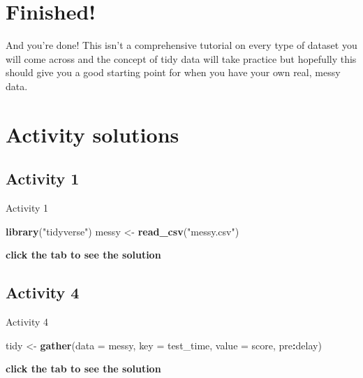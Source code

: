 \documentclass[]{book}
\newenvironment{Shaded}{\begin{snugshade}}{\end{snugshade}}
\newcommand{\DataTypeTok}[1]{\textcolor[rgb]{0.13,0.29,0.53}{#1}}
\newcommand{\KeywordTok}[1]{\textcolor[rgb]{0.13,0.29,0.53}{\textbf{#1}}}
\newcommand{\NormalTok}[1]{#1}
\newcommand{\OperatorTok}[1]{\textcolor[rgb]{0.81,0.36,0.00}{\textbf{#1}}}
\newcommand{\StringTok}[1]{\textcolor[rgb]{0.31,0.60,0.02}{#1}}
\begin{document}
\hypertarget{finished-5}{%
\section{Finished!}\label{finished-5}}

And you're done! This isn't a comprehensive tutorial on every type of dataset you will come across and the concept of tidy data will take practice but hopefully this should give you a good starting point for when you have your own real, messy data.

\hypertarget{activity-solutions-4}{%
\section{Activity solutions}\label{activity-solutions-4}}

\hypertarget{activity-1-2}{%
\subsection{Activity 1}\label{activity-1-2}}

Activity 1

\begin{Shaded}
\begin{Highlighting}[]
\KeywordTok{library}\NormalTok{(}\StringTok{"tidyverse"}\NormalTok{)}
\NormalTok{messy <-}\StringTok{ }\KeywordTok{read_csv}\NormalTok{(}\StringTok{"messy.csv"}\NormalTok{)}
\end{Highlighting}
\end{Shaded}

\textbf{click the tab to see the solution}

\hypertarget{activity-4-1}{%
\subsection{Activity 4}\label{activity-4-1}}

Activity 4

\begin{Shaded}
\begin{Highlighting}[]
\NormalTok{tidy <-}\StringTok{ }\KeywordTok{gather}\NormalTok{(}\DataTypeTok{data =}\NormalTok{ messy, }\DataTypeTok{key =}\NormalTok{ test_time, }\DataTypeTok{value =}\NormalTok{ score, pre}\OperatorTok{:}\NormalTok{delay)}
\end{Highlighting}
\end{Shaded}

\textbf{click the tab to see the solution}
\end{document}
